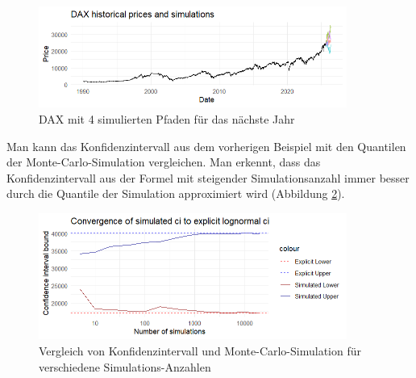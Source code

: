 \begin{figure}[H]
    \centering
    \includegraphics[width=0.9\textwidth]{images/dax_monte_carlo.png}
    \caption{DAX mit 4 simulierten Pfaden für das nächste Jahr}
    \label{fig:dax_monte_carlo}
\end{figure}

\begin{bsp}

Man kann das Konfidenzintervall aus dem vorherigen Beispiel mit den Quantilen der Monte-Carlo-Simulation vergleichen.
Man erkennt, dass das Konfidenzintervall aus der Formel mit steigender Simulationsanzahl immer besser durch die Quantile der Simulation approximiert wird (Abbildung \ref{fig:ci_comparison}).

\end{bsp}

\begin{figure}[H]
    \centering
    \includegraphics[width=0.9\textwidth]{images/ci_comparison.png}
    \caption{Vergleich von Konfidenzintervall und Monte-Carlo-Simulation für verschiedene Simulations-Anzahlen}
    \label{fig:ci_comparison}
\end{figure}